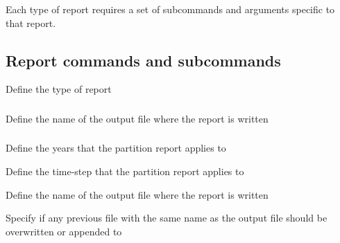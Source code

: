 Each type of report requires a set of subcommands and arguments specific to that report.

\subsection{Report commands and subcommands}


 {Define the type of report}

\subsubsection[Print the co-ordinates of the spatial map]{}

 {Define the name of the output file where the report is written}

\subsubsection[Print the partition]{}

 {Define the years that the partition report applies to}

 {Define the time-step that the partition report applies to}

 {Define the name of the output file where the report is written}

 {Specify if any previous file with the same name as the output file should be overwritten or appended to}

\subsubsection[Print the partition biomass]{}

